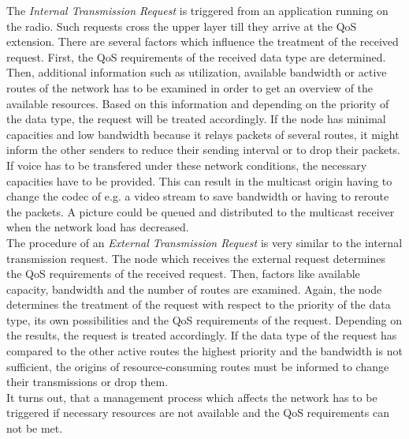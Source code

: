 \documentclass[runningheads]{llncs}
\newcommand{\QOS}{QoS}
\begin{document}
	 The \textit{Internal Transmission Request} is triggered from an application running on the radio. Such requests cross the upper layer till they arrive at the \QOS{} extension. There are several factors which influence the treatment of the received request. First, the \QOS{} requirements of the received data type are determined. Then, additional information such as utilization, available bandwidth or active routes of the network has to be examined in order to get an overview of the available resources. Based on this information and depending on the priority of the data type, the request will be treated accordingly. If the node has minimal capacities and low bandwidth because it relays packets of several routes, it might inform the other senders to reduce their sending interval or to drop their packets. If voice has to be transfered under these network conditions, the necessary capacities have to be provided. This can result in the multicast origin having to change the codec of e.g. a video stream to save bandwidth or having to reroute the packets. A picture could be queued and distributed to the multicast receiver when the network load has decreased.\\
	The procedure of an \textit{External Transmission Request} is very similar to the internal transmission request. The node which receives the external request determines the \QOS{} requirements of the received request. Then, factors like available capacity, bandwidth and the number of routes are examined. Again, the node determines the treatment of the request with respect to the priority of the data type, its own possibilities and the \QOS{} requirements of the request. Depending on the results, the request is treated accordingly. If the data type of the request has compared to the other active routes the highest priority and the bandwidth is not sufficient, the origins of resource-consuming routes must be informed to change their transmissions or drop them.\\
	It turns out, that a  management process which affects the network has to be triggered if necessary resources are not available and the \QOS{} requirements can not be met.
	
\end{document}
